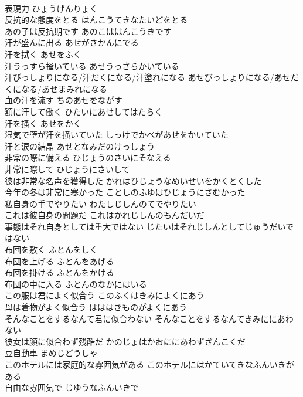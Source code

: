 \documentclass[8pt]{extreport}
\begin{document}
\begin{CJK}{UTF8}{min}
\\	表現力	ひょうげんりょく	
\\	反抗的な態度をとる	はんこうてきなたいどをとる	
\\	あの子は反抗期です	あのこははんこうきです	
\\	汗が盛んに出る	あせがさかんにでる	
\\	汗を拭く	あせをふく	
\\	汗うっすら掻いている	あせうっさらかいている	
\\	汗びっしょりになる/汗だくになる/汗塗れになる	あせびっしょりになる/あせだくになる/あせまみれになる	
\\	血の汗を流す	ちのあせをながす	
\\	額に汗して働く	ひたいにあせしてはたらく	
\\	汗を掻く	あせをかく	
\\	湿気で壁が汗を掻いていた	しっけでかべがあせをかいていた	
\\	汗と涙の結晶	あせとなみだのけっしょう	
\\	非常の際に備える	ひじょうのさいにそなえる	
\\	非常に際して	ひじょうにさいして	
\\	彼は非常な名声を獲得した	かれはひじょうなめいせいをかくとくした	
\\	今年の冬は非常に寒かった	ことしのふゆはひじょうにさむかった	
\\	私自身の手でやりたい	わたしじしんのてでやりたい	
\\	これは彼自身の問題だ	これはかれじしんのもんだいだ	
\\	事態はそれ自身としては重大ではない	じたいはそれじしんとしてじゅうだいではない	
\\	布団を敷く	ふとんをしく	
\\	布団を上げる	ふとんをあげる	
\\	布団を掛ける	ふとんをかける	
\\	布団の中に入る	ふとんのなかにはいる	
\\	この服は君によく似合う	このふくはきみによくにあう	
\\	母は着物がよく似合う	はははきものがよくにあう	
\\	そんなことをするなんて君に似合わない	そんなことをするなんてきみににあわない	
\\	彼女は顔に似合わず残酷だ	かのじょはかおににあわずざんこくだ	
\\	豆自動車	まめじどうしゃ	
\\	このホテルには家庭的な雰囲気がある	このホテルにはかていてきなふんいきがある	
\\	自由な雰囲気で	じゆうなふんいきで	

\end{CJK}
\end{document}
